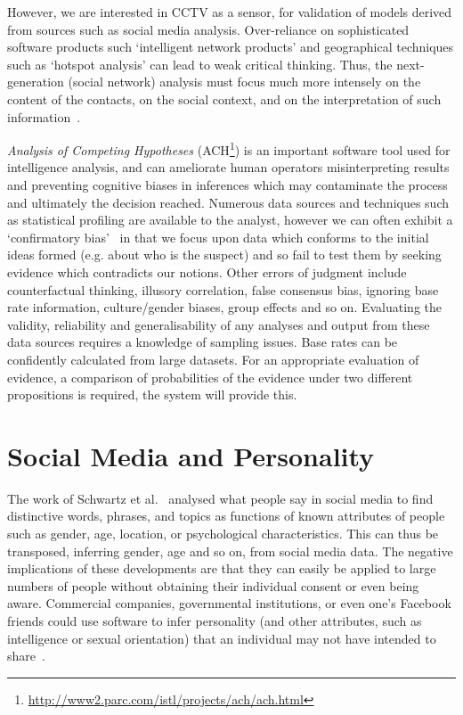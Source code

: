 \documentclass[conference]{IEEEtran}
\begin{document}
However, we are interested in CCTV as a sensor, for validation of
models derived from sources such as social media
analysis. Over-reliance on sophisticated software products such
`intelligent network products' and geographical techniques such as
`hotspot analysis' can lead to weak critical thinking. Thus, the
next-generation (social network) analysis must focus much more
intensely on the content of the contacts, on the social context, and
on the interpretation of such information~\cite{klerks:2001}.

{\emph{Analysis of Competing Hypotheses}}
(ACH\footnote{\url{http://www2.parc.com/istl/projects/ach/ach.html}})
is an important software tool used for intelligence analysis, and can
ameliorate human operators misinterpreting results and preventing
cognitive biases in inferences which may contaminate the process and
ultimately the decision reached. Numerous data sources and techniques
such as statistical profiling are available to the analyst, however we
can often exhibit a `confirmatory
bias'~\cite{lipton:2002,lipton:2005} in that we focus upon data which
conforms to the initial ideas formed (e.g. about who is the suspect)
and so fail to test them by seeking evidence which contradicts our
notions. Other errors of judgment include counterfactual thinking,
illusory correlation, false consensus bias, ignoring base rate
information, culture/gender biases, group effects and so
on. Evaluating the validity, reliability and generalisability of any
analyses and output from these data sources requires a knowledge of
sampling issues. Base rates can be confidently calculated from large
datasets. For an appropriate evaluation of evidence, a comparison of
probabilities of the evidence under two different propositions is
required, the system will provide this.

\section{Social Media and Personality}\label{socmed+pers}

The work of Schwartz et al.~\cite{schwartz-et-al:2013} analysed what
people say in social media to find distinctive words, phrases, and
topics as functions of known attributes of people such as gender, age,
location, or psychological characteristics. This can thus be
transposed, inferring gender, age and so on, from social media
data. The negative implications of these developments are that they
can easily be applied to large numbers of people without obtaining
their individual consent or even being aware. Commercial companies,
governmental institutions, or even one’s Facebook friends could use
software to infer personality (and other attributes, such as
intelligence or sexual orientation) that an individual may not have
intended to share~\cite{lambiotte+kosinski:2014}.
\end{document}
